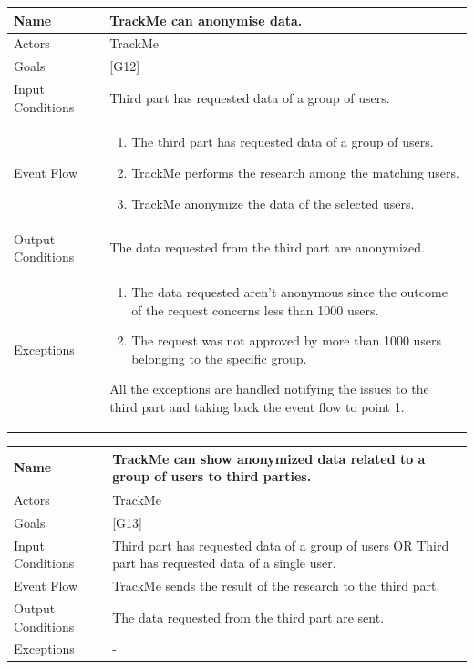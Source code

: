 \documentclass{article}
\begin{document}
\begin{center}
    \begin{tabular}{ | l | p{10cm} |}
    \hline
    Name & TrackMe can anonymise data. \\ \hline
    Actors & TrackMe\\ \hline
   	Goals & {[G12]}\\ \hline
    Input Conditions & Third part has requested data of a group of users.\\ \hline
    Event Flow & \begin{enumerate}
    	\item The third part has requested data of a group of users.
		\item TrackMe performs the research among the matching users.
		\item TrackMe anonymize the data of the selected users.
    \end{enumerate} \\ \hline
    Output Conditions & The data requested from the third part are anonymized. \\ \hline
    Exceptions & \begin{enumerate}
  		\item The data requested aren’t anonymous since the outcome of the request concerns less than 1000 users.
  		\item The request was not approved by more than 1000 users belonging to the specific group.
\end{enumerate} All the exceptions are handled notifying the issues to the third part and taking back the event flow to point 1.    \\ \hline
    \end{tabular}
\end{center}

\begin{center}
    \begin{tabular}{ | l | p{10cm} |}
    \hline
    Name & TrackMe can show anonymized data related to a group of users to third parties. \\ \hline
    Actors & TrackMe\\ \hline
   	Goals & {[G13]}\\ \hline
    Input Conditions & Third part has requested data of a group of users OR Third part has requested data of a single user.\\ \hline
    Event Flow & TrackMe sends the result of the research to the third part. \\ \hline
    Output Conditions & The data requested from the third part are sent. \\ \hline
    Exceptions & -  \\ \hline
    \end{tabular}
\end{center}
\end{document}
